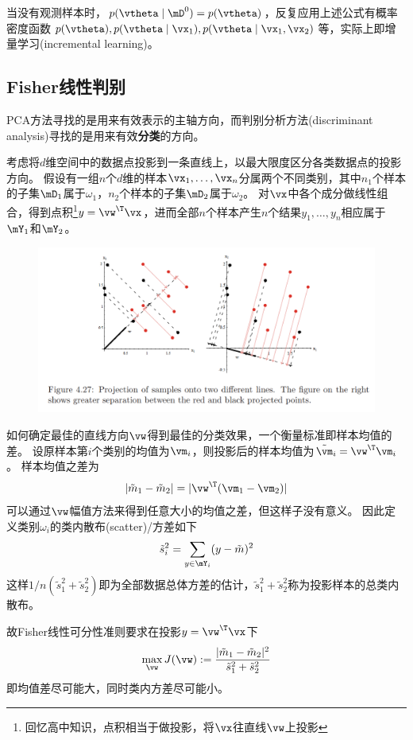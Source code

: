 当没有观测样本时，$p(\vtheta\mid\mD^0)=p(\vtheta)$，反复应用上述公式有概率密度函数$p(\vtheta),p(\vtheta\mid\vx_1),p(\vtheta\mid\vx_1,\vx_2)$等，实际上即增量学习(incremental learning)。

\subsection{Fisher线性判别}
PCA方法寻找的是用来有效表示的主轴方向，而判别分析方法(discriminant analysis)寻找的是用来有效\textbf{分类}的方向。

考虑将$d$维空间中的数据点投影到一条直线上，以最大限度区分各类数据点的投影方向。
假设有一组$n$个$d$维的样本$\vx_1,\ldots,\vx_n$分属两个不同类别，其中$n_1$个样本的子集$\mD_1$属于$\omega_1$，$n_2$个样本的子集$\mD_2$属于$\omega_2$。
对$\vx$中各个成分做线性组合，得到点积\footnote{回忆高中知识，点积相当于做投影，将$\vx$往直线$\vw$上投影}$y=\vw^\T\vx$，进而全部$n$个样本产生$n$个结果$y_1,\ldots,y_n$相应属于$\mY_1$和$\mY_2$。
\begin{figure}[H]
\centering
\includegraphics[width=0.9\linewidth]{fig/Fisher.png}
\end{figure}

如何确定最佳的直线方向$\vw$得到最佳的分类效果，一个衡量标准即样本均值的差。
设原样本第$i$个类别的均值为$\vm_i$，则投影后的样本均值为$\tilde{\vm}_i=\vw^\T\vm_i$。
样本均值之差为
\[|\tilde{m}_1-\tilde{m}_2|=|\vw^\T(\vm_1-\vm_2)|\]
可以通过$\vw$幅值方法来得到任意大小的均值之差，但这样子没有意义。
因此定义类别$\omega_i$的类内散布(scatter)/方差如下
\[\tilde{s}_i^2=\sum_{y\in\mY_i}(y-\tilde{m})^2\]
这样$1/n(\tilde{s}_1^2+\tilde{s}_2^2)$即为全部数据总体方差的估计，$\tilde{s}_1^2+\tilde{s}_2^2$称为投影样本的总类内散布。

故Fisher线性可分性准则要求在投影$y=\vw^\T\vx$下
\[\max_{\vw} J(\vw):=\frac{|\tilde{m}_1-\tilde{m}_2|^2}{\tilde{s}_1^2+\tilde{s}_2^2}\]
即均值差尽可能大，同时类内方差尽可能小。

